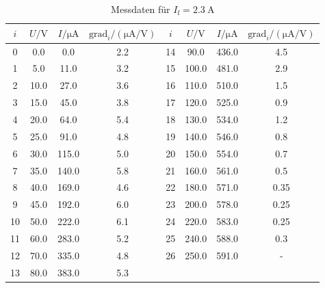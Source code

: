 \begin{table}
    \centering
    \begin{tabular}{S[table-format=:.0] S S S S[table-format=:.0] S S S}
        \toprule
        {$i$} &
        {$U / \unit{\volt}$} &
        {$I/ \unit{\micro\ampere}$} &
        {$\text{grad}_i/ (\unit{\micro\ampere\per\volt})$}&
        {$i$} &
        {$U / \unit{\volt}$} &
        {$I/ \unit{\micro\ampere}$} &
        {$\text{grad}_i/ (\unit{\micro\ampere\per\volt})$} \\
           & 0.0       & 0.0      & 2.2  &       14  & 90.0      & 436.0    & 4.5 \\
        1   & 5.0       & 11.0     & 3.2  &       15  & 100.0     & 481.0    & 2.9 \\
        2   & 10.0      & 27.0     & 3.6  &       16  & 110.0     & 510.0    & 1.5 \\
        3   & 15.0      & 45.0     & 3.8  &       17  & 120.0     & 525.0    & 0.9 \\
        4   & 20.0      & 64.0     & 5.4  &       18  & 130.0     & 534.0    & 1.2 \\
        5   & 25.0      & 91.0     & 4.8  &       19  & 140.0     & 546.0    & 0.8 \\
        6   & 30.0      & 115.0    & 5.0  &       20  & 150.0     & 554.0    & 0.7 \\
        7   & 35.0      & 140.0    & 5.8  &       21  & 160.0     & 561.0    & 0.5 \\
        8   & 40.0      & 169.0    & 4.6  &       22  & 180.0     & 571.0    & 0.35 \\
        9   & 45.0      & 192.0    & 6.0  &       23  & 200.0     & 578.0    & 0.25 \\
        10  & 50.0      & 222.0    & 6.1  &       24  & 220.0     & 583.0    & 0.25 \\
        11  & 60.0      & 283.0    & 5.2  &       25  & 240.0     & 588.0    & 0.3 \\
        12  & 70.0      & 335.0    & 4.8  &       26  & 250.0     & 591.0    & {-} \\
        13  & 80.0      & 383.0    & 5.3  & & & &  \\

        \bottomrule
    \end{tabular}
    \caption{Messdaten für $I_\text{f}= \qty{2.3}{\ampere}$}
    \label{tab:c02}
\end{table}